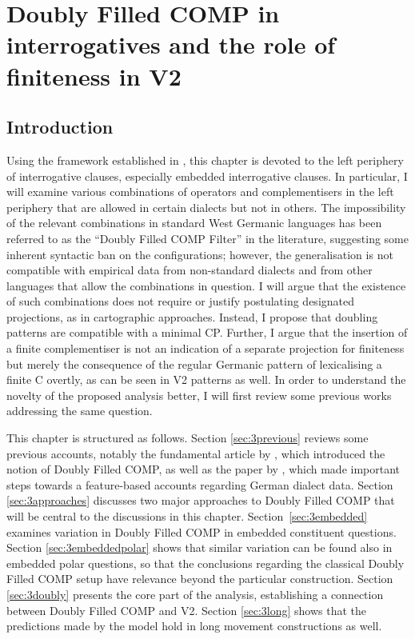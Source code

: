 \chapter{Doubly Filled COMP in interrogatives and the role of finiteness in V2} \label{ch:3}
\section{Introduction} \label{sec:3introduction}
Using the framework established in , this chapter is devoted to the left periphery of interrogative clauses, especially embedded interrogative clauses. In particular, I will examine various combinations of operators and complementisers in the left periphery that are allowed in certain dialects but not in others. The impossibility of the relevant combinations in standard West Germanic languages has been referred to as the ``Doubly Filled COMP Filter'' in the literature, suggesting some inherent syntactic ban on the configurations; however, the generalisation is not compatible with empirical data from non-standard dialects and from other languages that allow the combinations in question. I will argue that the existence of such combinations does not require or justify postulating designated projections, as in cartographic approaches. Instead, I propose that doubling patterns are compatible with a minimal CP. Further, I argue that the insertion of a finite complementiser is not an indication of a separate projection for finiteness but merely the consequence of the regular Germanic pattern of lexicalising a finite C overtly, as can be seen in V2 patterns as well. In order to understand the novelty of the proposed analysis better, I will first review some previous works addressing the same question.

This chapter is structured as follows. Section \ref{sec:3previous} reviews some previous accounts, notably the fundamental article by \citet{chomskylasnik1977}, which introduced the notion of Doubly Filled COMP, as well as the paper by \citet{bayerbrandner2008}, which made important steps towards a feature-based accounts regarding German dialect data. Section \ref{sec:3approaches} discusses two major approaches to Doubly Filled COMP that will be central to the discussions in this chapter. Section~\ref{sec:3embedded} examines variation in Doubly Filled COMP in embedded constituent questions. Section \ref{sec:3embeddedpolar} shows that similar variation can be found also in embedded polar questions, so that the conclusions regarding the classical Doubly Filled COMP setup have relevance beyond the particular construction. Section \ref{sec:3doubly} presents the core part of the analysis, establishing a connection between Doubly Filled COMP and V2. Section \ref{sec:3long} shows that the predictions made by the model hold in long movement constructions as well.

